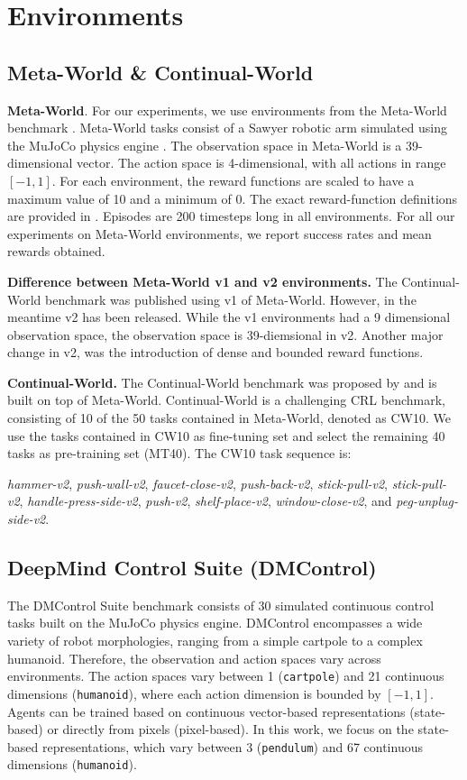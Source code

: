 
\appendix
\section{Environments} \label{appendix:environments}
\subsection{Meta-World \& Continual-World}
\textbf{Meta-World}. For our experiments, we use environments from the Meta-World benchmark \citep{Yu:22}. Meta-World tasks consist of a Sawyer robotic arm simulated using the MuJoCo physics engine \citep{Todorov:12}. 
The observation space in Meta-World is a 39-dimensional vector.
The action space is 4-dimensional, with all actions in range $[-1, 1]$.
For each environment, the reward functions are scaled to have a maximum value of 10 and a minimum of 0. The exact reward-function definitions are provided in \citet{Yu:22}. Episodes are 200 timesteps long in all environments. For all our experiments on Meta-World environments, we report success rates and mean rewards obtained. 

\textbf{Difference between Meta-World v1 and v2 environments.} The Continual-World benchmark was published using v1 of Meta-World. However, in the meantime v2 has been released. While the v1 environments had a 9 dimensional observation space, the observation space is 39-diemsional in v2. Another major change in v2, was the introduction of dense and bounded reward functions. 

\textbf{Continual-World.}
The Continual-World benchmark was proposed by \citet{Wolczyk:21} and is built on top of Meta-World.
Continual-World is a challenging CRL benchmark, consisting of 10 of the 50 tasks contained in Meta-World, denoted as CW10. We use the tasks contained in CW10 as fine-tuning set and select the remaining 40 tasks as pre-training set (MT40). The CW10 task sequence is:

\textit{hammer-v2}, \textit{push-wall-v2}, \textit{faucet-close-v2}, \textit{push-back-v2}, \textit{stick-pull-v2}, \textit{stick-pull-v2}, \textit{handle-press-side-v2}, \textit{push-v2}, \textit{shelf-place-v2}, 
\textit{window-close-v2}, and \textit{peg-unplug-side-v2}. 

\subsection{DeepMind Control Suite (DMControl)}
The DMControl Suite benchmark \citep{Tassa:18} consists of 30 simulated continuous control tasks built on the MuJoCo physics engine. DMControl encompasses a wide variety of robot morphologies, ranging from a simple cartpole to a complex humanoid. Therefore, the observation and action spaces vary across environments. The action spaces vary between 1 (\texttt{cartpole}) and 21 continuous dimensions (\texttt{humanoid}), where each action dimension is bounded by $[-1, 1]$. Agents can be trained based on continuous vector-based representations (state-based) or directly from pixels (pixel-based). In this work, we focus on the state-based representations, which vary between 3 (\texttt{pendulum}) and 67 continuous dimensions (\texttt{humanoid}). 

